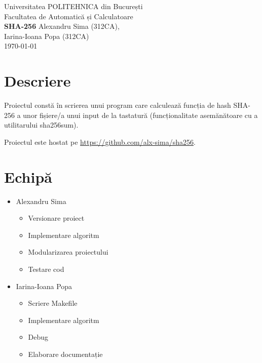 \documentclass{article}
\begin{document}
\pagestyle{fancy}
\begin{titlepage}
      \begin{center}
            Universitatea POLITEHNICA din București \\
            Facultatea de Automatică și Calculatoare \\[5px]
            \vfill
            {\huge\bf SHA-256}
            \vfill
            Alexandru Sima (312CA), \\
            Iarina-Ioana Popa (312CA) \\
            \small\today
      \end{center}
\end{titlepage}

\tableofcontents
\newpage

\section{Descriere}
Proiectul constă în scrierea unui program care calculează funcția de hash
SHA-256 a unor fișiere/a unui input de la tastatură (funcționalitate
asemănătoare cu a utilitarului sha256sum).

Proiectul este hostat pe 
\url{https://github.com/alx-sima/sha256}.

\section{Echipă}
\begin{itemize}
      \item Alexandru Sima
            \begin{itemize}
                  \item Versionare proiect
                  \item Implementare algoritm
                  \item Modularizarea proiectului
                  \item Testare cod
            \end{itemize}
      \item Iarina-Ioana Popa
            \begin{itemize}
                  \item Scriere Makefile
                  \item Implementare algoritm
                  \item Debug
                  \item Elaborare documentație
            \end{itemize}
\end{itemize}
\end{document}
